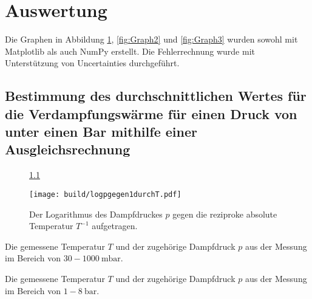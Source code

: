 \section{Auswertung}
\label{sec:Auswertung}
Die Graphen in Abbildung \ref{fig:Graph1}, \ref{fig:Graph2} und \ref{fig:Graph3} wurden sowohl mit Matplotlib \cite{matplotlib} als auch NumPy \cite{numpy} erstellt. Die Fehlerrechnung wurde mit Unterstützung von Uncertainties \cite{uncertainties} durchgeführt.
\subsection{Bestimmung des durchschnittlichen Wertes für die Verdampfungswärme für einen Druck von unter einen Bar mithilfe einer Ausgleichsrechnung}
\begin{figure}\ref{}
	\centering
	\caption{Der Logarithmus des Dampfdruckes $p$ gegen die reziproke absolute Temperatur $T^{-1}$ aufgetragen.}
	\texttt{[image: build/logpgegen1durchT.pdf]}
	\label{fig:Graph1}
\end{figure}
\begin{center}
	\begin{table}
		\caption{Die gemessene Temperatur $T$ und der zugehörige Dampfdruck $p$ aus der Messung im Bereich von $30-\SI{1000}{\milli\bar}$.}
		\begin{minipage}[t]{0.24\textwidth}
			\centering
			
		\end{minipage}
		\begin{minipage}[t]{0.24\textwidth}
			\centering
			
		\end{minipage}
		\begin{minipage}[t]{0.24\textwidth}
			\centering
			
		\end{minipage}
		\begin{minipage}[t]{0.24\textwidth}
			\centering
			
		\end{minipage}
	\end{table}
	\begin{table}
		\caption{Die gemessene Temperatur $T$ und der zugehörige Dampfdruck $p$ aus der Messung im Bereich von $1-\SI{8}{\bar}$.}
		\begin{minipage}[t]{0.5\textwidth}
			\centering
			
		\end{minipage}
		\begin{minipage}[t]{0.5\textwidth}
			\centering
			
		\end{minipage}
	\end{table}
\end{center}


